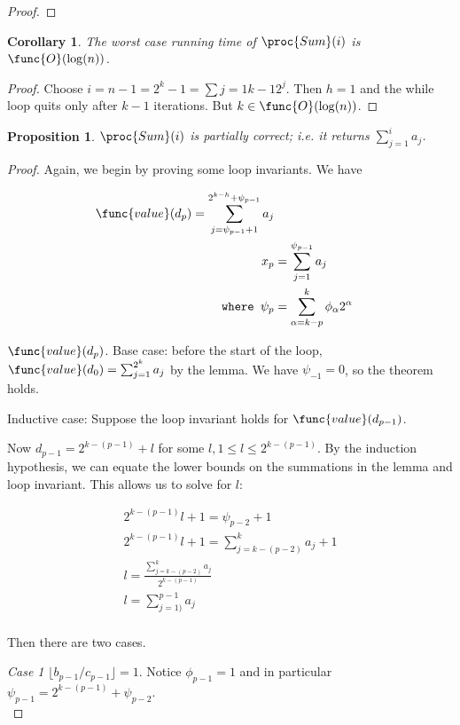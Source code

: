 \documentclass[11pt, answers]{exam}
\theoremstyle{plain}
\newtheorem{corollary}{Corollary}
\newtheorem{proposition}{Proposition}
\theoremstyle{definition}
\begin{document}
\begin{questions}
\begin{parts}
\begin{solution}
\begin{proof}
\end{proof}

\begin{corollary} \label{runtime1}
The worst case running time of $\proc{Sum}(i)$ is $\func{O}(\log(n))$.
\end{corollary}
\begin{proof}
Choose $i = n - 1 = 2^k -1 = \sum{j=1}{k-1}2^j$. Then $h = 1$ and the while loop quits only after $k-1$ iterations. But $k \in \func{O}(\log(n))$.
\end{proof}

\begin{proposition}
$\proc{Sum}(i)$ is partially correct; i.e. it returns $\sum_{j=1}^{i}a_j$.
\end{proposition}

\begin{proof}
Again, we begin by proving some loop invariants. We have

\begin{align*}
\func{value}(d_p) = \sum_{j=\psi_{p-1} + 1}^{2^{k-h} + \psi_{p-1}}a_j \\
x_p &= \sum_{j=1}^{\psi_{p-1}}a_j \\
\texttt{where  } \psi_p &= \sum_{\alpha = k-p}^{k}\phi_{\alpha}2^{\alpha}
\end{align*}

$\func{value}(d_p)$. Base case: before the start of the loop, $\func{value}(d_0) = \sum_{j = 1}^{2^{k}}a_j$ by the lemma. We have $\psi_{-1} = 0$, so the theorem holds. 

Inductive case: Suppose the loop invariant holds for $\func{value}(d_{p-1})$. 

Now $d_{p-1} = 2^{k-(p-1)}+ \mathit{l}$ for some $\mathit{l} , 1 \leq \mathit{l} \leq 2^{k-(p-1)}$. By the induction hypothesis, we can equate the lower bounds on the summations in the lemma and loop invariant. This allows us to solve for $\mathit{l}$:

\begin{align*}
2^{k-(p-1)}\mathit{l} + 1 = \psi_{p-2} + 1 \\
2^{k-(p-1)}\mathit{l} + 1 = \sum_{j=k-(p-2)}^{k}a_j + 1 \\
\mathit{l}= \frac{\sum_{j=k-(p-2)}^{k}a_j}{2^{k-(p-1)}} \\
\mathit{l}= \sum_{j=1)}^{p-1}a_j \\
\end{align*}

Then there are two cases.

\textit{Case 1} $\lfloor b_{p-1}/c_{p-1} \rfloor = 1$. Notice $\phi_{p-1} = 1$ and in particular $\psi_{p-1} = 2^{k-(p-1)} + \psi_{p-2}.$\\


\end{proof}
\end{solution}
\end{parts}
\end{questions}
\end{document}
